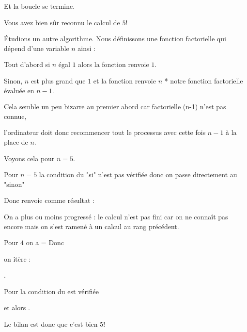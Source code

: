 Et la boucle se termine.


\change

Vous avez bien sûr reconnu le calcul de $5!$




\diapo

\'Etudions un autre algorithme. Nous définissons une fonction factorielle qui dépend d'une variable $n$
ainsi :

Tout d'abord si $n$ égal $1$ alors la fonction renvoie $1$.

Sinon, $n$ est plus grand que $1$ et la fonction renvoie $n$ * notre fonction factorielle
évaluée en $n-1$.

Cela semble un peu bizarre au premier abord car factorielle (n-1) n'est pas connue,

l'ordinateur doit donc recommencer tout le processus avec cette fois $n-1$ à la place de $n$.

\change

Voyons cela pour $n=5$.

Pour $n=5$ la condition du "si"  n'est pas vérifiée donc on passe directement au "sinon"

\change

Donc  renvoie comme résultat : 

On a plus ou moins progressé : le calcul n'est pas fini car on ne connaît pas encore 
mais on s'est ramené à un calcul au rang précédent.

\change

Pour $4$ on a =
Donc 

\change


on itère :


\change

.

Pour  la condition du  est vérifiée 

\change

et alors  .

\change

Le bilan est donc que 
c'est bien $5!$


